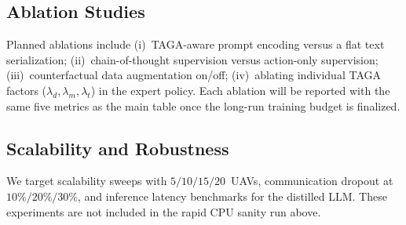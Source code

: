 \subsection{Ablation Studies}

Planned ablations include (i)~TAGA-aware prompt encoding versus a flat text
serialization; (ii)~chain-of-thought supervision versus action-only supervision;
(iii)~counterfactual data augmentation on/off; (iv)~ablating individual TAGA
factors ($\lambda_d, \lambda_m, \lambda_t$) in the expert policy.  Each
ablation will be reported with the same five metrics as the main table once the
long-run training budget is finalized.

\subsection{Scalability and Robustness}

We target scalability sweeps with $5/10/15/20$~UAVs, communication dropout at
$10\%/20\%/30\%$, and inference latency benchmarks for the distilled LLM.
These experiments are not included in the rapid CPU sanity run above.

%
